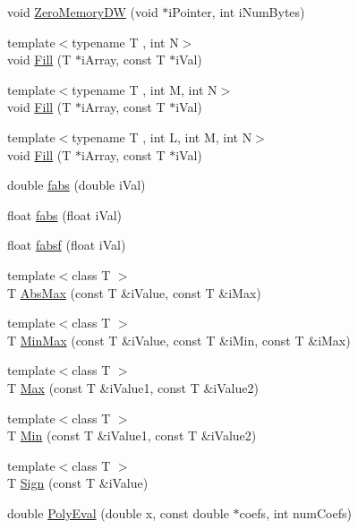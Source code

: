 \begin{DoxyCompactItemize}
\item 
void \hyperlink{a00288_a0e598e79488a12354e9dbc340fa99b5a}{Zero\+Memory\+D\+W} (void $\ast$i\+Pointer, int i\+Num\+Bytes)
\item 
{\footnotesize template$<$typename T , int N$>$ }\\void \hyperlink{a00288_a1e72222769ecdf34fa73ae38c0c709df}{Fill} (T $\ast$i\+Array, const T $\ast$i\+Val)
\item 
{\footnotesize template$<$typename T , int M, int N$>$ }\\void \hyperlink{a00288_a480beff32ac0847c665f735fd8f78c0a}{Fill} (T $\ast$i\+Array, const T $\ast$i\+Val)
\item 
{\footnotesize template$<$typename T , int L, int M, int N$>$ }\\void \hyperlink{a00288_a114e6f06cf5789da4aad7ae0d786876e}{Fill} (T $\ast$i\+Array, const T $\ast$i\+Val)
\item 
double \hyperlink{a00288_aa4fa4d0765a764b020102cdbff8b45b0}{fabs} (double i\+Val)
\item 
float \hyperlink{a00288_af486dfb226661e4a47d7b42eca881759}{fabs} (float i\+Val)
\item 
float \hyperlink{a00288_a7fc4d4cd59850b8b875d085467ff5850}{fabsf} (float i\+Val)
\item 
{\footnotesize template$<$class T $>$ }\\T \hyperlink{a00288_aa4cbb7d8707ad89fc5ba5169ebb75201}{Abs\+Max} (const T \&i\+Value, const T \&i\+Max)
\item 
{\footnotesize template$<$class T $>$ }\\T \hyperlink{a00288_aca59c4cdf56130ee251118c02a9963e3}{Min\+Max} (const T \&i\+Value, const T \&i\+Min, const T \&i\+Max)
\item 
{\footnotesize template$<$class T $>$ }\\T \hyperlink{a00288_a55ac62cf1b543338c58f8dd0d747c56c}{Max} (const T \&i\+Value1, const T \&i\+Value2)
\item 
{\footnotesize template$<$class T $>$ }\\T \hyperlink{a00288_a38c17ad30c1eb394bfa06e662d8d2598}{Min} (const T \&i\+Value1, const T \&i\+Value2)
\item 
{\footnotesize template$<$class T $>$ }\\T \hyperlink{a00288_ab6a3e1aef81cd84dec2eee9a27755bb0}{Sign} (const T \&i\+Value)
\item 
double \hyperlink{a00288_aa0094a6a87ca0c48f58b48ce5eea636e}{Poly\+Eval} (double x, const double $\ast$coefs, int num\+Coefs)

\end{DoxyCompactItemize}
